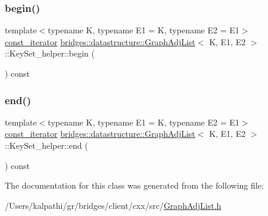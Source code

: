 \subsubsection{\texorpdfstring{begin()}{begin()}}
{\footnotesize\ttfamily template$<$typename K, typename E1 = K, typename E2 = E1$>$ \\
\mbox{\hyperlink{classbridges_1_1datastructure_1_1_graph_adj_list_1_1_key_set__helper_1_1const__iterator}{const\+\_\+iterator}} \mbox{\hyperlink{classbridges_1_1datastructure_1_1_graph_adj_list}{bridges\+::datastructure\+::\+Graph\+Adj\+List}}$<$ K, E1, E2 $>$\+::Key\+Set\+\_\+helper\+::begin (\begin{DoxyParamCaption}{ }\end{DoxyParamCaption}) const\hspace{0.3cm}{\ttfamily [inline]}}

\mbox{\label{classbridges_1_1datastructure_1_1_graph_adj_list_1_1_key_set__helper_a6204f2d6c81b2b4cc72387cbce6c4f0d}} 
\subsubsection{\texorpdfstring{end()}{end()}}
{\footnotesize\ttfamily template$<$typename K, typename E1 = K, typename E2 = E1$>$ \\
\mbox{\hyperlink{classbridges_1_1datastructure_1_1_graph_adj_list_1_1_key_set__helper_1_1const__iterator}{const\+\_\+iterator}} \mbox{\hyperlink{classbridges_1_1datastructure_1_1_graph_adj_list}{bridges\+::datastructure\+::\+Graph\+Adj\+List}}$<$ K, E1, E2 $>$\+::Key\+Set\+\_\+helper\+::end (\begin{DoxyParamCaption}{ }\end{DoxyParamCaption}) const\hspace{0.3cm}{\ttfamily [inline]}}



The documentation for this class was generated from the following file\+:\begin{DoxyCompactItemize}
\item 
/\+Users/kalpathi/gr/bridges/client/cxx/src/\mbox{\hyperlink{_graph_adj_list_8h}{Graph\+Adj\+List.\+h}}\end{DoxyCompactItemize}
